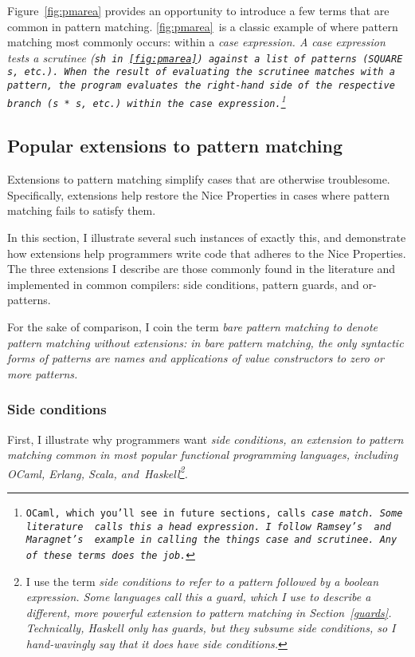 \documentclass[manuscript,screen,review, 12pt, nonacm]{acmart}
\begin{document}
    Figure~\ref{fig:pmarea} provides an opportunity to introduce a few terms
    that are common in pattern matching. \ref{fig:pmarea}~is a classic example
    of where pattern matching most commonly occurs: within a \it{case}
    expression. A \it{case} expression tests a \it{scrutinee} (\tt{sh}
    in~\ref{fig:pmarea}) against a list of patterns (\tt{SQUARE s}, etc.). When
    the result of evaluating the scrutinee matches with a pattern, the program
    evaluates the right-hand side of the respective branch (\tt{s * s}, etc.)
    within the \it{case} expression.\footnote{OCaml, which you'll see in future
    sections, calls \it{case} \tt{match}. Some literature~\cite{guardproposal}
    calls this a \it{head expression}. I follow Ramsey's~\cite{bpc} and
    Maragnet's~\cite{maranget} example in calling the things \it{case} and
    \it{scrutinee}. Any of these terms does the job.} 

\subsection{Popular extensions to pattern matching}
\label{extensions}

    Extensions to pattern matching simplify cases that are otherwise
    troublesome. Specifically, extensions help restore the Nice Properties in
    cases where pattern matching fails to satisfy them. 
    
    In this section, I illustrate several such instances of exactly this, and
    demonstrate how extensions help programmers write code that adheres to the
    Nice Properties. The three extensions I describe are those commonly found in
    the literature and implemented in common compilers: side conditions, pattern
    guards, and or-patterns. 
    
    For the sake of comparison, I coin the term \it{bare pattern matching} to
    denote pattern matching \it{without} extensions: in bare pattern matching,
    the only syntactic forms of patterns are names and applications of value
    constructors to zero or more patterns. 



\subsubsection{Side conditions}

    First, I illustrate why programmers want \it{side conditions}, an extension
    to pattern matching common in most popular functional programming languages,
    including OCaml, Erlang, Scala, and~Haskell\footnote{I use the term \it{side
    conditions} to refer to a pattern followed by a boolean expression. Some
    languages call this a \it{guard}, which I use to describe a different, more
    powerful extension to pattern matching in Section~\ref{guards}.  
    Technically, Haskell \it{only} has guards, but they subsume side conditions,
    so I hand-wavingly say that it does have side conditions.}. 
    
\end{document}
